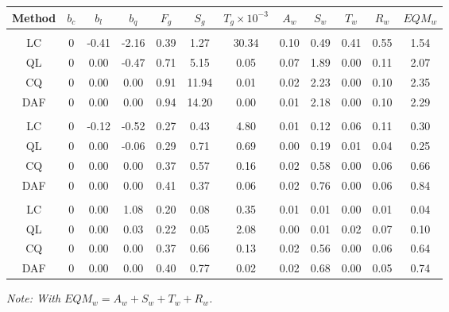 \documentclass[
]{article}
\newcommand\1{\mathds{1}}
\begin{document}
\begin{table}
{\centering
\begin{tabular}[t]{cccccccccccc}
\toprule
Method & $b_c$ & $b_l$ & $b_q$ & $F_g$ & $S_g$ & $T_g \times 10^{-3}$ & $A_w$ & $S_w$ & $T_w$ & $R_w$ & $EQM_w$\\
\midrule
\addlinespace[0.3em]
\multicolumn{12}{l}{\textbf{$q=0$}}\\
\hspace{1em}LC & 0 & -0.41 & -2.16 & 0.39 & 1.27 & 30.34 & 0.10 & 0.49 & 0.41 & 0.55 & 1.54\\
\hspace{1em}QL & 0 & 0.00 & -0.47 & 0.71 & 5.15 & 0.05 & 0.07 & 1.89 & 0.00 & 0.11 & 2.07\\
\hspace{1em}CQ & 0 & 0.00 & 0.00 & 0.91 & 11.94 & 0.01 & 0.02 & 2.23 & 0.00 & 0.10 & 2.35\\
\hspace{1em}DAF & 0 & 0.00 & 0.00 & 0.94 & 14.20 & 0.00 & 0.01 & 2.18 & 0.00 & 0.10 & 2.29\\
\addlinespace[0.3em]
\multicolumn{12}{l}{\textbf{$q=1$}}\\
\hspace{1em}LC & 0 & -0.12 & -0.52 & 0.27 & 0.43 & 4.80 & 0.01 & 0.12 & 0.06 & 0.11 & 0.30\\
\hspace{1em}QL & 0 & 0.00 & -0.06 & 0.29 & 0.71 & 0.69 & 0.00 & 0.19 & 0.01 & 0.04 & 0.25\\
\hspace{1em}CQ & 0 & 0.00 & 0.00 & 0.37 & 0.57 & 0.16 & 0.02 & 0.58 & 0.00 & 0.06 & 0.66\\
\hspace{1em}DAF & 0 & 0.00 & 0.00 & 0.41 & 0.37 & 0.06 & 0.02 & 0.76 & 0.00 & 0.06 & 0.84\\
\addlinespace[0.3em]
\multicolumn{12}{l}{\textbf{$q=2$}}\\
\hspace{1em}LC & 0 & 0.00 & 1.08 & 0.20 & 0.08 & 0.35 & 0.01 & 0.01 & 0.00 & 0.01 & 0.04\\
\hspace{1em}QL & 0 & 0.00 & 0.03 & 0.22 & 0.05 & 2.08 & 0.00 & 0.01 & 0.02 & 0.07 & 0.10\\
\hspace{1em}CQ & 0 & 0.00 & 0.00 & 0.37 & 0.66 & 0.13 & 0.02 & 0.56 & 0.00 & 0.06 & 0.64\\
\hspace{1em}DAF & 0 & 0.00 & 0.00 & 0.40 & 0.77 & 0.02 & 0.02 & 0.68 & 0.00 & 0.05 & 0.74\\
\bottomrule
\end{tabular}

\textit{Note: With $EQM_w=A_w + S_w + T_w + R_w$.}

}

\end{table}%
\end{document}
